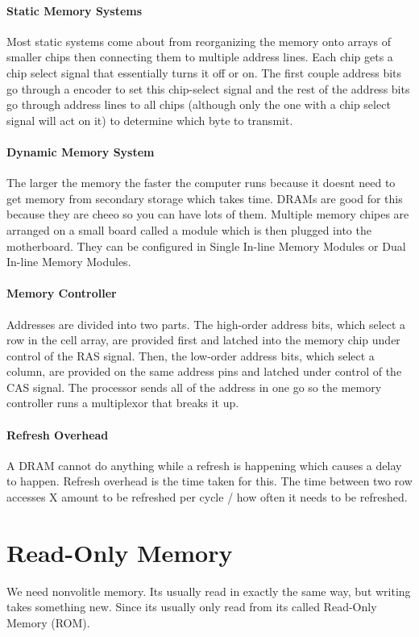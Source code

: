 \documentclass[12pt]{article}
\begin{document}
\paragraph*{Static Memory Systems}
Most static systems come about from reorganizing the memory onto arrays of smaller chips then connecting them to multiple address lines. Each chip gets a chip select signal that essentially turns it off or on. The first couple address bits go through a encoder to set this chip-select signal and the rest of the address bits go through address lines to all chips (although only the one with a chip select signal will act on it) to determine which byte to transmit.
\paragraph*{Dynamic Memory System}
The larger the memory the faster the computer runs because it doesnt need to get memory from secondary storage which takes time. DRAMs are good for this because they are cheeo so you can have lots of them. Multiple memory chipes are arranged on a small board called a module which is then plugged into the motherboard. They can be configured in Single In-line Memory Modules or Dual In-line Memory Modules. 
\paragraph*{Memory Controller}
Addresses are divided into two parts. The high-order address bits, which select a row in the cell array, are provided first and latched into the memory chip under control of the RAS signal. Then, the low-order address bits, which select a column, are provided on the same address pins and latched under control of the CAS signal. The processor sends all of the address in one go so the memory controller runs a multiplexor that breaks it up.
\paragraph*{Refresh Overhead}
A DRAM cannot do anything while a refresh is happening which causes a delay to happen. Refresh overhead is the time taken for this. The time between two row accesses X amount to be refreshed per cycle / how often it needs to be refreshed.
\section*{Read-Only Memory}
We need nonvolitle memory. Its usually read in exactly the same way, but writing takes something new. Since its usually only read from its called Read-Only Memory (ROM).
\end{document}

